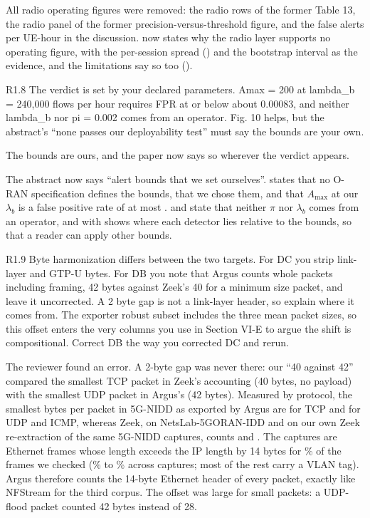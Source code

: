 \action All radio operating figures were removed: the radio rows of the former Table 13, the radio panel of the former precision-versus-threshold figure, and the false alerts per UE-hour in the discussion.  now states why the radio layer supports no operating figure, with the per-session spread () and the bootstrap interval as the evidence, and the limitations say so too ().



\label{rv:R1.8}
\begin{concern}{R1.8}
The verdict is set by your declared parameters. Amax = 200 at lambda\_b = 240,000 flows per hour requires FPR at or below about 0.00083, and neither lambda\_b nor pi = 0.002 comes from an operator. Fig. 10 helps, but the abstract's ``none passes our deployability test'' must say the bounds are your own.
\end{concern}
\response The bounds are ours, and the paper now says so wherever the verdict appears.

\action The abstract now says ``alert bounds that we set ourselves''.  states that no O-RAN specification defines the bounds, that we chose them, and that $A_{\max}$ at our $\lambda_b$ is a false positive rate of at most \RFPRmax.  and  state that neither $\pi$ nor $\lambda_b$ comes from an operator, and  with  shows where each detector lies relative to the bounds, so that a reader can apply other bounds.

\label{rv:R1.9}
\begin{concern}{R1.9}
Byte harmonization differs between the two targets. For DC you strip link-layer and GTP-U bytes. For DB you note that Argus counts whole packets including framing, 42 bytes against Zeek's 40 for a minimum size packet, and leave it uncorrected. A 2 byte gap is not a link-layer header, so explain where it comes from. The exporter robust subset includes the three mean packet sizes, so this offset enters the very columns you use in Section VI-E to argue the shift is compositional. Correct DB the way you corrected DC and rerun.
\end{concern}
\response The reviewer found an error. A 2-byte gap was never there: our ``40 against 42'' compared the smallest TCP packet in Zeek's accounting (40 bytes, no payload) with the smallest UDP packet in Argus's (42 bytes). Measured by protocol, the smallest bytes per packet in 5G-NIDD as exported by Argus are \RArgMinTCP{} for TCP and \RArgMinUDP{} for UDP and ICMP, whereas Zeek, on NetsLab-5GORAN-IDD and on our own Zeek re-extraction of the same 5G-NIDD captures, counts \RZkMinTCP{} and \RZkMinUDP. The captures are Ethernet frames whose length exceeds the IP length by 14 bytes for \RPcapEthPct\% of the frames we checked (\RPcapEthPctMin\% to \RPcapEthPctMax\% across \RPcapEthFiles{} captures; most of the rest carry a VLAN tag). Argus therefore counts the 14-byte Ethernet header of every packet, exactly like NFStream for the third corpus. The offset was large for small packets: a UDP-flood packet counted 42 bytes instead of 28.

